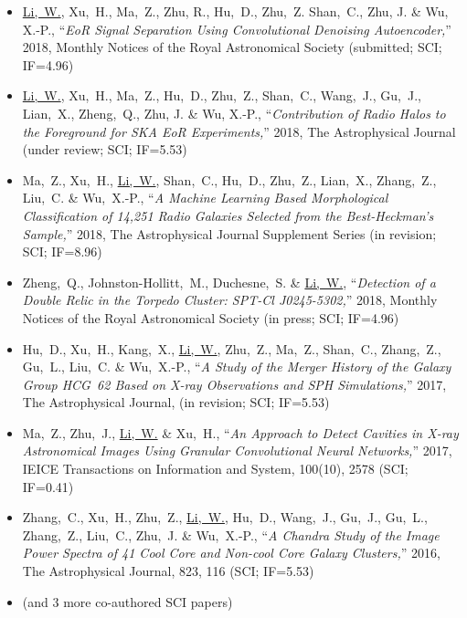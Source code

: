 \documentclass{resume}
\begin{document}
\begin{itemize}
  \small
  \item \uline{Li,~W.}, Xu,~H., Ma,~Z., Zhu, R., Hu,~D., Zhu,~Z.
    Shan,~C., Zhu, J. \& Wu, X.-P.,
    \enquote{\it EoR Signal Separation Using Convolutional Denoising
      Autoencoder,}
    2018, Monthly Notices of the Royal Astronomical Society
    (submitted; SCI; IF=4.96)
  \item \uline{Li,~W.}, Xu,~H., Ma,~Z., Hu,~D., Zhu,~Z., Shan,~C.,
    Wang,~J., Gu,~J., Lian,~X., Zheng,~Q., Zhu, J. \& Wu, X.-P.,
    \enquote{\it Contribution of Radio Halos to the Foreground for
      SKA EoR Experiments,}
    2018, The Astrophysical Journal (under review; SCI; IF=5.53)
  \item Ma,~Z., Xu,~H., \uline{Li,~W.}, Shan,~C., Hu,~D., Zhu,~Z.,
    Lian,~X., Zhang,~Z., Liu,~C. \& Wu,~X.-P.,
    \enquote{\it A Machine Learning Based Morphological Classification
      of 14,251 Radio Galaxies Selected from the Best-Heckman's Sample,}
    2018, The Astrophysical Journal Supplement Series
    (in revision; SCI; IF=8.96)
  \item Zheng,~Q., Johnston-Hollitt,~M., Duchesne,~S. \& \uline{Li,~W.},
    \enquote{\it Detection of a Double Relic in the Torpedo Cluster:
      SPT-Cl J0245-5302,}
    2018, Monthly Notices of the Royal Astronomical Society
    (in press; SCI; IF=4.96)
  \item Hu,~D., Xu,~H., Kang,~X., \uline{Li,~W.}, Zhu,~Z., Ma,~Z.,
    Shan,~C., Zhang,~Z., Gu,~L., Liu,~C. \& Wu,~X.-P.,
    \enquote{\it A Study of the Merger History of the Galaxy Group
      HCG~62 Based on X-ray Observations and SPH Simulations,}
    2017, The Astrophysical Journal, (in revision; SCI; IF=5.53)
  \item Ma,~Z., Zhu,~J., \uline{Li,~W.} \& Xu,~H.,
    \enquote{\it An Approach to Detect Cavities in X-ray Astronomical
      Images Using Granular Convolutional Neural Networks,}
    2017, IEICE Transactions on Information and System, 100(10), 2578
    (SCI; IF=0.41)
  \item Zhang,~C., Xu,~H., Zhu,~Z., \uline{Li,~W.}, Hu,~D., Wang,~J.,
    Gu,~J., Gu,~L., Zhang,~Z., Liu,~C., Zhu,~J. \& Wu,~X.-P.,
    \enquote{\it A Chandra Study of the Image Power Spectra of 41
      Cool Core and Non-cool Core Galaxy Clusters,}
    2016, The Astrophysical Journal, 823, 116 (SCI; IF=5.53)
  \item (and 3 more co-authored SCI papers)
\end{itemize}
\end{document}
